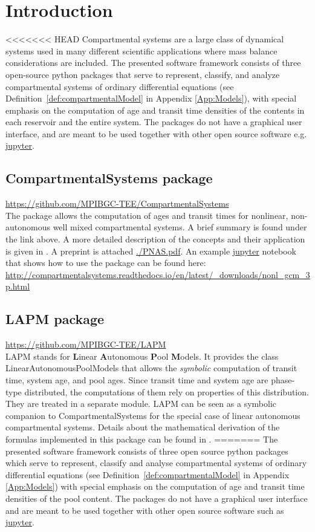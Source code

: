 \documentclass[a4paper]{article}
\DeclareRobustCommand{\Defref}[1]{\mbox{Definition \ref{#1}}}
\DeclareRobustCommand{\Appendixref}[1]{Appendix \ref{#1}}
\begin{document}
\section{Introduction}
<<<<<<< HEAD
Compartmental systems are a large class of dynamical systems used in many different scientific applications
where mass balance considerations are included.
The presented software framework consists of three open-source python packages 
that serve to represent, classify, and analyze compartmental systems of ordinary differential equations (see \Defref{def:compartmentalModel} in \Appendixref{App:Models}), with special emphasis on the computation of age and transit time densities of the contents in each reservoir and the entire system.  
The packages do not have a graphical user interface, and are meant to be used together with other open source software e.g. \href{jupyter.org}{jupyter}. 

\subsection{CompartmentalSystems package}
\url{https://github.com/MPIBGC-TEE/CompartmentalSystems}\\
The package allows the computation of ages and transit times for nonlinear, non-autonomous well mixed compartmental systems.
A brief summary is found under the link above. A more detailed description of the concepts and their application is given in \citet[]{MetzlerMuellerSierra2018PNAS}. A preprint is attached \url{./PNAS.pdf}.
An example \href{jupyter.org}{jupyter} notebook that shows how to use the package can be found here:
\url{http://compartmentalsystems.readthedocs.io/en/latest/_downloads/nonl_gcm_3p.html}

\subsection{LAPM package}
\url{https://github.com/MPIBGC-TEE/LAPM}\\
LAPM stands for {\bf L}inear {\bf A}utonomous {\bf P}ool {\bf M}odels. It provides the class LinearAutonomousPoolModels that allows the \emph{symbolic} computation of transit time, system age, and pool ages.
Since transit time and system age are phase-type distributed, the computations of them rely on properties of this distribution. They are treated in a separate module.
LAPM can be seen as a symbolic companion to CompartmentalSystems for the special case of linear autonomous compartmental systems.
Details about the mathematical derivation of the formulas implemented in this package can be found in \citet{Metzler2018MGS}.
=======
The presented software framework consists of three open source python packages
which serve to represent, classify and analyse compartmental systems of ordinary differential equations (see \Defref{def:compartmentalModel} in \Appendixref{App:Models}) 
with special emphasis on the computation of age and transit time densities of the pool content.  
The packages do not have a graphical user interface and are meant to be used together with other open source software such as \href{jupyter.org}{jupyter}. 
\end{document}
